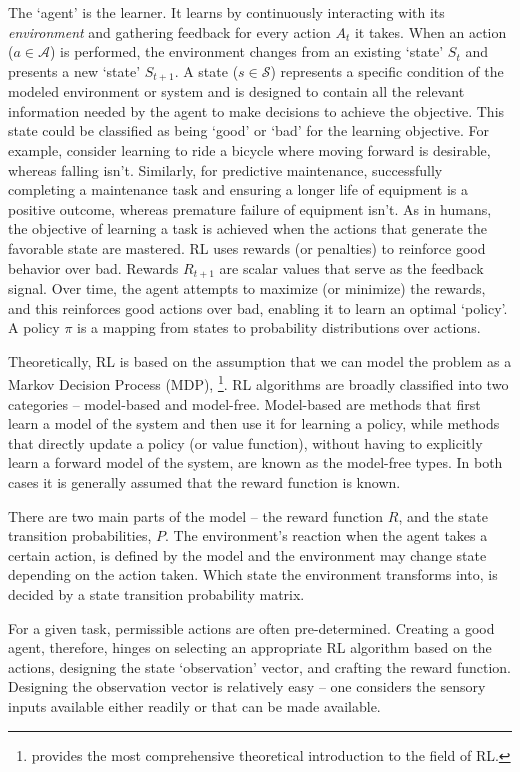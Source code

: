 \documentclass{article}
\begin{document}
The `agent' is the learner. It learns by continuously interacting with its \textit{environment} and gathering feedback for every action $A_t$ it takes. When an action ($a\in \mathcal{A}$) is performed, the environment changes from an existing `state' $S_t$ and presents a new `state' $S_{t+1}$. A state ($s\in \mathcal{S}$) represents a specific condition of the modeled environment or system and is designed to contain all the relevant information needed by the agent to make decisions to achieve the objective. This state could be classified as being `good' or `bad' for the learning objective. For example, consider learning to ride a bicycle where moving forward is desirable, whereas falling isn't. Similarly, for predictive maintenance, successfully completing a maintenance task and ensuring a longer life of equipment is a positive outcome, whereas premature failure of equipment isn't. As in humans, the objective of learning a task is achieved when the actions that generate the favorable state are mastered. RL uses rewards (or penalties) to reinforce good behavior over bad. Rewards $R_{t+1}$ are scalar values that serve as the feedback signal. Over time, the agent attempts to maximize (or minimize) the rewards, and this reinforces good actions over bad, enabling it to learn an optimal `policy'. A policy $\pi$ is a mapping from states to probability distributions over actions.

Theoretically, RL is based on the assumption that we can model the problem as a Markov Decision Process (MDP), \citep{sutton2018}\footnote{\citet{sutton2018} provides the most comprehensive theoretical introduction to the field of RL.}. 
RL algorithms are broadly classified into two categories -- model-based and model-free. Model-based are methods that first learn a model of the system and then use it for learning a policy, while methods that directly update a policy (or value function), without having to explicitly learn a forward model of the system, are known as the model-free types. In both cases it is generally assumed that the reward function is known.

There are two main parts of the model -- the reward function $R$, and the state transition probabilities, $P$. The environment's reaction when the agent takes a certain action, is defined by the model and the environment may change state depending on the action taken. Which state the environment transforms into, is decided by a state transition probability matrix. 

For a given task, permissible actions are often pre-determined. Creating a good agent, therefore, hinges on selecting an appropriate RL algorithm based on the actions, designing the state `observation' vector, and crafting the reward function. Designing the observation vector is relatively easy -- one considers the sensory inputs available either readily or that can be made available. 
\end{document}
